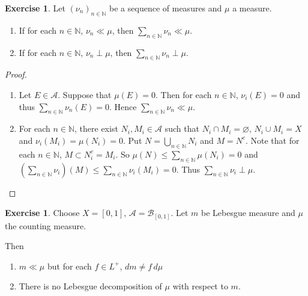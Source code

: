 \documentclass{book}
\theoremstyle{definition}
\newtheorem{ex}[definition]{Exercise}
\newcommand{\N}{\mathbb{N}}
\newcommand{\MA}{\mathcal{A}}
\newcommand{\MB}{\mathcal{B}}
\newcommand{\lex}[1]{\label{ex:#1}}
\DeclareMathOperator*{\0}{\mbf{0}}
\DeclareMathOperator*{\1}{\mbf{1}}
\newcommand{\dmu}{\, d \mu}
\begin{document}
	\begin{ex} \lex{00000} 
		Let $(\nu_n)_{n \in \N}$ be a sequence of measures and $\mu$ a measure. 
		\begin{enumerate}
			\item If for each $n \in \N$, $\nu_n \ll \mu$, then $\sum_{n \in \N} \nu_n \ll \mu$. 
			\item If for each $n \in \N$, $\nu_n \perp \mu$, then $\sum_{n \in \N} \nu_n \perp \mu$.
		\end{enumerate} 
	\end{ex}
	
	\begin{proof}
		\begin{enumerate}
			\item Let $E \in \MA$. Suppose that $\mu(E) = 0$. Then for each $n \in \N$, $\nu_i(E) = 0$ and thus $\sum_{n \in \N} \nu_n(E) = 0$. Hence $\sum_{n \in \N} \nu_n \ll \mu$.
			\item For each $n \in \N$, there exist $N_i, M_i \in \MA$ such that $N_i \cap M_i = \varnothing$, $N_i \cup M_i = X$ and $\nu_i(M_i) = \mu(N_i) = 0$. Put $N = \bigcup_{n \in \N} N_i$ and $M = N^c$. Note that for each $n \in \N$, $M \subset N_i^c = M_i$. So $\mu(N) \leq \sum_{n \in \N} \mu(N_i) = 0$ and $(\sum_{n \in \N} \nu_i) (M) \leq \sum_{n \in \N} \nu_i(M_i) = 0$. Thus $\sum_{n \in \N} \nu_i \perp \mu$.
		\end{enumerate}
	\end{proof}
	
	
	\begin{ex} \lex{00000} 
		Choose $X = [0,1]$, $\MA = \MB_{[0,1]}$. Let $m$ be Lebesgue measure and $\mu$ the counting measure. 
		
		Then 
		\begin{enumerate}
			\item $m \ll \mu$ but for each $f \in L^+$, $dm \neq f \dmu$
			\item There is no Lebesgue decomposition of $\mu$ with respect to $m$.
		\end{enumerate}
	\end{ex}
	
\end{document}
